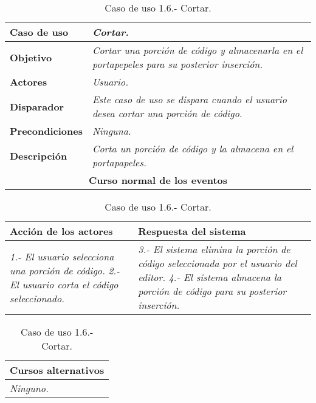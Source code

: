    \begin{table}[!ht] %
      \centering
      \begin{tabular}{|p{4cm}|p{11.5cm}|}
      \hline
      \textbf{Caso de uso} & \textit{Cortar.}\\ \hline
      \textbf{Objetivo} & \textit{Cortar una porción de código y almacenarla en el portapepeles para su posterior inserción.}\\ \hline
      \textbf{Actores} & \textit{Usuario.}\\ \hline
      \textbf{Disparador} & \textit{Este caso de uso se dispara cuando el usuario desea cortar una porción de código.}\\ \hline
      \textbf{Precondiciones} & \textit{Ninguna.}\\ \hline
      \textbf{Descripción} & \textit{Corta un porción de código y la almacena en el portapapeles.}\\ \hline
      \multicolumn{2}{|c|}{\textbf{Curso normal de los eventos}}\\ \hline
    \end{tabular}
    \begin{tabular}{|p{7.75cm}|p{7.75cm}|}
      \hspace{2cm}\textbf{Acción de los actores} & \hspace{1.75cm}\textbf{Respuesta del sistema}\\ \hline
      \textit{1.- El usuario selecciona una porción de código.} \textit{2.- El usuario corta el código seleccionado.} &
                                             \textit{3.- El sistema elimina la porción de código seleccionada por el usuario del editor.}
                                             \textit{4.- El sistema almacena la porción de código para su posterior inserción.} \\ \hline
    \end{tabular}
    \begin{tabular}{|p{15.9cm}|}
      \hspace{6cm}\textbf{Cursos alternativos}\\ \hline     
      \textit{Ninguno.} \\ \hline
    \end{tabular}
    \caption{Caso de uso 1.6.- Cortar.}
   \end{table}


